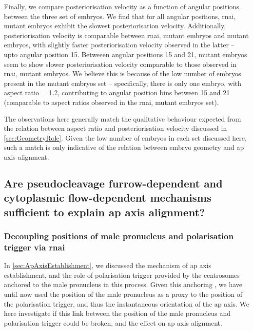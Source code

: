 Finally, we compare posteriorisation velocity as a function of angular positions between the three set of embryos. We find that for all angular positions,  \ac{rnai},  mutant embryos exhibit the slowest posteriorisation velocity. Additionally, posteriorisation velocity is comparable between  \ac{rnai},   mutant embryos and   mutant embryos, with slightly faster posteriorisation velocity observed in the latter --  upto angular position \SI{15}{\unitAngle}. Betweeen angular positions \SI{15}{\unitAngle} and \SI{21}{\unitAngle},   mutant embryos seem to show slower posteriorisation velocity comparable to those observed in  \ac{rnai},  mutant embryos. We believe this is because of the low number of embryos present in the  mutant embryos set -- specifically, there is only one embryo, with aspect ratio \aspectRatio = \num{1.2}, contributing to angular position bins between \SI{15}{\unitAngle} and \SI{21}{\unitAngle} (comparable to aspect ratios observed in the  \ac{rnai},  mutant embryos set).

The observations here generally match the qualitative behaviour expected from the relation between aspect ratio and posteriorisation velocity discussed in \autoref{sec:GeometryRole}. Given the low number of embryos in each set discussed here, such a match is only indicative of the relation between embryo geometry and \ac{ap} axis alignment.

\subsection{Are pseudocleavage furrow-dependent and cytoplasmic flow-dependent mechanisms sufficient to explain \acs{ap} axis alignment?}\label{subsec:sufficiencyTestAir1}

\subsubsection{Decoupling positions of male pronucleus and polarisation trigger via  \ac{rnai}}\label{subsubsec:air1rnaiDecoupleMalePronucleusPolarisation}
In \autoref{sec:ApAxisEstablishment}, we discussed the mechanism of \ac{ap} axis establishment, and the role of polarisation trigger provided by the centrosomes anchored to the male pronucleus in this process. Given this anchoring \citep{de2016dynein}, we have until now used the position of the male pronucleus as a proxy to the position of the polarisation trigger, and thus the instantaneous orientation of the \ac{ap} axis. We here investigate if this link between the position of the male pronucleus and polarisation trigger could be broken, and the effect on \ac{ap} axis alignment.

